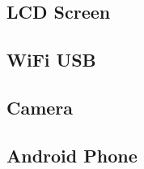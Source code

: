 \subsection{LCD Screen}



\subsection{WiFi USB}



\subsection{Camera}



\subsection{Android Phone}



